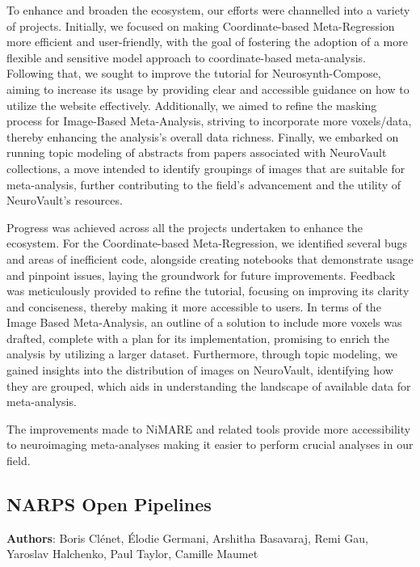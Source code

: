 \documentclass{article}
\begin{document}
To enhance and broaden the ecosystem, our efforts were channelled into a variety of projects. Initially, we focused on making Coordinate-based Meta-Regression more efficient and user-friendly, with the goal of fostering the adoption of a more flexible and sensitive model approach to coordinate-based meta-analysis. Following that, we sought to improve the tutorial for Neurosynth-Compose, aiming to increase its usage by providing clear and accessible guidance on how to utilize the website effectively. Additionally, we aimed to refine the masking process for Image-Based Meta-Analysis, striving to incorporate more voxels/data, thereby enhancing the analysis's overall data richness. Finally, we embarked on running topic modeling of abstracts from papers associated with NeuroVault collections, a move intended to identify groupings of images that are suitable for meta-analysis, further contributing to the field's advancement and the utility of NeuroVault's resources.

Progress was achieved across all the projects undertaken to enhance the ecosystem. For the Coordinate-based Meta-Regression, we identified several bugs and areas of inefficient code, alongside creating notebooks that demonstrate usage and pinpoint issues, laying the groundwork for future improvements. Feedback was meticulously provided to refine the tutorial, focusing on improving its clarity and conciseness, thereby making it more accessible to users. In terms of the Image Based Meta-Analysis, an outline of a solution to include more voxels was drafted, complete with a plan for its implementation, promising to enrich the analysis by utilizing a larger dataset. Furthermore, through topic modeling, we gained insights into the distribution of images on NeuroVault, identifying how they are grouped, which aids in understanding the landscape of available data for meta-analysis.

The improvements made to NiMARE and related tools provide more accessibility to neuroimaging meta-analyses making it easier to perform crucial analyses in our field.




\subsection{NARPS Open Pipelines}
\textbf{Authors}: Boris Clénet, Élodie Germani, Arshitha Basavaraj, Remi Gau, Yaroslav Halchenko, Paul Taylor, Camille Maumet
\end{document}
